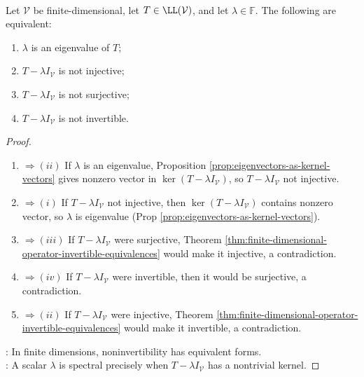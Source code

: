 \begin{theorem} \label{thm:equivalent-eigenvalue-conditions} \\
Let $\mathcal{V}$ be finite-dimensional, let $T\in\LL(\mathcal{V})$, and let $\lambda\in\mathbb{F}$. The following are equivalent:
\begin{enumerate}[label=(\roman*)]
\setlength{\itemsep}{0pt}
\item $\lambda$ is an eigenvalue of $T$;
\item $T-\lambda I_{\mathcal{V}}$ is not injective;
\item $T-\lambda I_{\mathcal{V}}$ is not surjective;
\item $T-\lambda I_{\mathcal{V}}$ is not invertible.
\end{enumerate}
\begin{proof}
\begin{enumerate}[label=(\roman*).]
\setlength{\itemsep}{0pt}
\item[$(i)$]$\Rightarrow (ii)$ If $\lambda$ is an eigenvalue, Proposition \ref{prop:eigenvectors-as-kernel-vectors} gives nonzero vector in $\ker(T-\lambda I_{\mathcal{V}})$, so $T-\lambda I_{\mathcal{V}}$ not injective.
\item[$(ii)$]$\Rightarrow (i)$ If $T-\lambda I_{\mathcal{V}}$ not injective, then $\ker(T-\lambda I_{\mathcal{V}})$ contains nonzero vector, so $\lambda$ is eigenvalue (Prop \ref{prop:eigenvectors-as-kernel-vectors}).
\item[$(ii)$]$\Rightarrow (iii)$ If $T-\lambda I_{\mathcal{V}}$ were surjective, Theorem \ref{thm:finite-dimensional-operator-invertible-equivalences} would make it injective, a contradiction.
\item[$(iii)$]$\Rightarrow (iv)$ If $T-\lambda I_{\mathcal{V}}$ were invertible, then it would be surjective, a contradiction.
\item[$(iv)$]$\Rightarrow (ii)$ If $T-\lambda I_{\mathcal{V}}$ were injective, Theorem \ref{thm:finite-dimensional-operator-invertible-equivalences} would make it invertible, a contradiction.
\end{enumerate}
: In finite dimensions, noninvertibility has equivalent forms.\\
: A scalar $\lambda$ is spectral precisely when $T-\lambda I_{\mathcal{V}}$ has a nontrivial kernel.
\end{proof}
\end{theorem}

